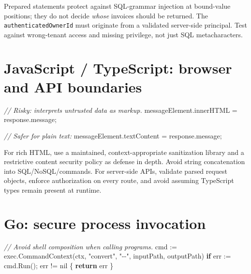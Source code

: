 \documentclass[
  letterpaper,
]{article}
\newenvironment{Shaded}{}{}
\newcommand{\AttributeTok}[1]{\textcolor[rgb]{0.49,0.56,0.16}{#1}}
\newcommand{\CommentTok}[1]{\textcolor[rgb]{0.38,0.63,0.69}{\textit{#1}}}
\newcommand{\ControlFlowTok}[1]{\textcolor[rgb]{0.00,0.44,0.13}{\textbf{#1}}}
\newcommand{\NormalTok}[1]{#1}
\newcommand{\OperatorTok}[1]{\textcolor[rgb]{0.40,0.40,0.40}{#1}}
\newcommand{\OtherTok}[1]{\textcolor[rgb]{0.00,0.44,0.13}{#1}}
\newcommand{\StringTok}[1]{\textcolor[rgb]{0.25,0.44,0.63}{#1}}
\begin{document}
Prepared statements protect against SQL-grammar injection at bound-value
positions; they do not decide \emph{whose} invoices should be returned.
The \texttt{authenticatedOwnerId} must originate from a validated
server-side principal. Test against wrong-tenant access and missing
privilege, not just SQL metacharacters.

\section{JavaScript / TypeScript: browser and API
boundaries}\label{javascript-typescript-browser-and-api-boundaries}

\begin{Shaded}
\begin{Highlighting}[]
\CommentTok{// Risky: interprets untrusted data as markup.}
\NormalTok{messageElement}\OperatorTok{.}\AttributeTok{innerHTML} \OperatorTok{=}\NormalTok{ response}\OperatorTok{.}\AttributeTok{message}\OperatorTok{;}

\CommentTok{// Safer for plain text:}
\NormalTok{messageElement}\OperatorTok{.}\AttributeTok{textContent} \OperatorTok{=}\NormalTok{ response}\OperatorTok{.}\AttributeTok{message}\OperatorTok{;}
\end{Highlighting}
\end{Shaded}

For rich HTML, use a maintained, context-appropriate sanitization
library and a restrictive content security policy as defense in depth.
Avoid string concatenation into SQL/NoSQL/commands. For server-side
APIs, validate parsed request objects, enforce authorization on every
route, and avoid assuming TypeScript types remain present at runtime.

\section{Go: secure process
invocation}\label{go-secure-process-invocation}

\begin{Shaded}
\begin{Highlighting}[]
\CommentTok{// Avoid shell composition when calling programs.}
\NormalTok{cmd }\OperatorTok{:=}\NormalTok{ exec}\OperatorTok{.}\NormalTok{CommandContext}\OperatorTok{(}\NormalTok{ctx}\OperatorTok{,} \StringTok{"convert"}\OperatorTok{,} \StringTok{"{-}{-}"}\OperatorTok{,}\NormalTok{ inputPath}\OperatorTok{,}\NormalTok{ outputPath}\OperatorTok{)}
\ControlFlowTok{if}\NormalTok{ err }\OperatorTok{:=}\NormalTok{ cmd}\OperatorTok{.}\NormalTok{Run}\OperatorTok{();}\NormalTok{ err }\OperatorTok{!=} \OtherTok{nil} \OperatorTok{\{}
    \ControlFlowTok{return}\NormalTok{ err}
\OperatorTok{\}}
\end{Highlighting}
\end{Shaded}
\end{document}
